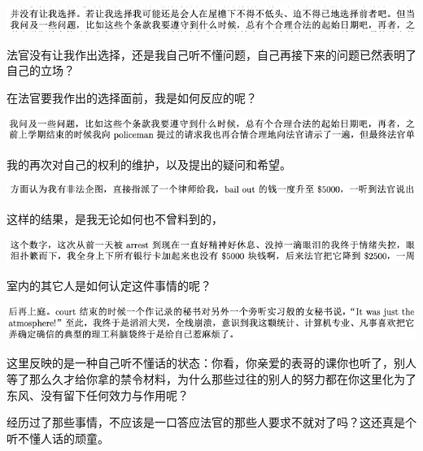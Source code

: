 \documentclass[9pt, b5paper]{article}
\begin{document}
\begin{center}
\includegraphics[width=.9\linewidth]{./pic/backups_plans_20210506_084705.png}
\end{center}

法官没有让我作出选择，还是我自己听不懂问题，自己再接下来的问题已然表明了自己的立场？

在法官要我作出的选择面前，我是如何反应的呢？

\begin{center}
\includegraphics[width=.9\linewidth]{./pic/backups_plans_20210506_084619.png}
\end{center}

我的再次对自己的权利的维护，以及提出的疑问和希望。

\begin{center}
\includegraphics[width=.9\linewidth]{./pic/backups_plans_20210506_084809.png}
\end{center}

这样的结果，是我无论如何也不曾料到的，

\begin{center}
\includegraphics[width=.9\linewidth]{./pic/backups_plans_20210506_084845.png}
\end{center}

室内的其它人是如何认定这件事情的呢？

\begin{center}
\includegraphics[width=.9\linewidth]{./pic/backups_plans_20210506_084919.png}
\end{center}

这里反映的是一种自己听不懂话的状态：你看，你亲爱的表哥的课你也听了，别人等了那么久才给你拿的禁令材料，为什么那些过往的别人的努力都在你这里化为了东风、没有留下任何效力与作用呢？

经历过了那些事情，不应该是一口答应法官的那些人要求不就对了吗？这还真是个听不懂人话的顽童。
\end{document}

